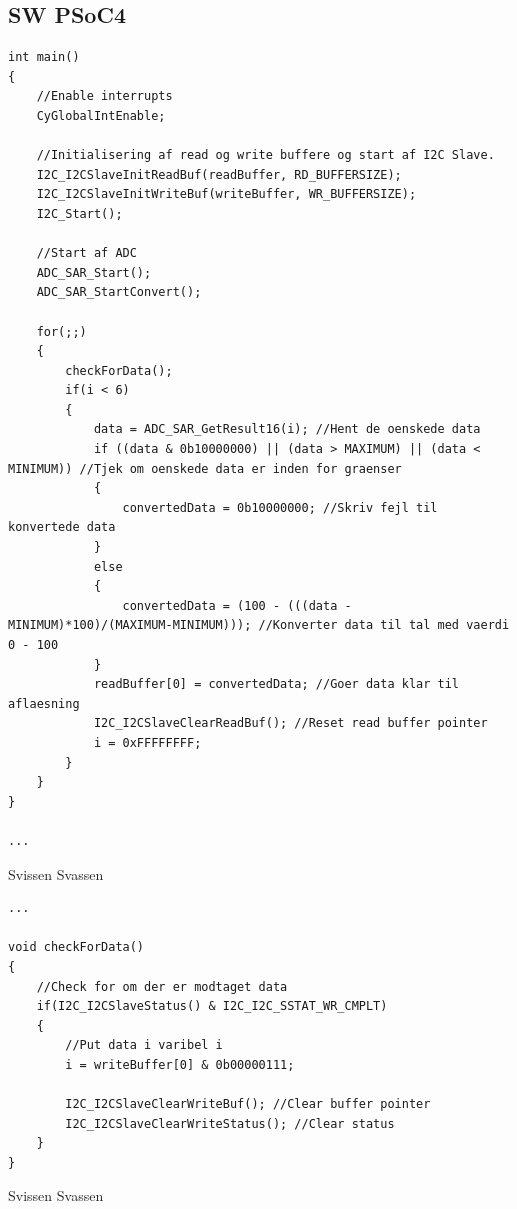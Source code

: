 \clearpage

\subsection{SW PSoC4}

\begin{lstlisting}[caption=Udsnit A af main.c for PSoC4 i Jordfugt, label=fig:main1_jordfugt]
int main()
{
    //Enable interrupts
    CyGlobalIntEnable; 
    
    //Initialisering af read og write buffere og start af I2C Slave.
    I2C_I2CSlaveInitReadBuf(readBuffer, RD_BUFFERSIZE);
    I2C_I2CSlaveInitWriteBuf(writeBuffer, WR_BUFFERSIZE);
    I2C_Start();
    
    //Start af ADC
    ADC_SAR_Start();
    ADC_SAR_StartConvert();

    for(;;)
    {
        checkForData();
        if(i < 6)
        {
            data = ADC_SAR_GetResult16(i); //Hent de oenskede data
            if ((data & 0b10000000) || (data > MAXIMUM) || (data < MINIMUM)) //Tjek om oenskede data er inden for graenser
            {
                convertedData = 0b10000000; //Skriv fejl til konvertede data
            }
            else
            {
                convertedData = (100 - (((data - MINIMUM)*100)/(MAXIMUM-MINIMUM))); //Konverter data til tal med vaerdi 0 - 100
            }
            readBuffer[0] = convertedData; //Goer data klar til aflaesning
            I2C_I2CSlaveClearReadBuf(); //Reset read buffer pointer
            i = 0xFFFFFFFF;
        }
    }
}

...
\end{lstlisting}

Svissen Svassen

\clearpage

\begin{lstlisting}[caption=Udsnit B af main.c for PSoC4 i Jordfugt, label=fig:main2_jordfugt]
...

void checkForData()
{
    //Check for om der er modtaget data
    if(I2C_I2CSlaveStatus() & I2C_I2C_SSTAT_WR_CMPLT)
    {
        //Put data i varibel i            
        i = writeBuffer[0] & 0b00000111;
        
        I2C_I2CSlaveClearWriteBuf(); //Clear buffer pointer
        I2C_I2CSlaveClearWriteStatus(); //Clear status                               
    }
}
\end{lstlisting}

Svissen Svassen

\clearpage